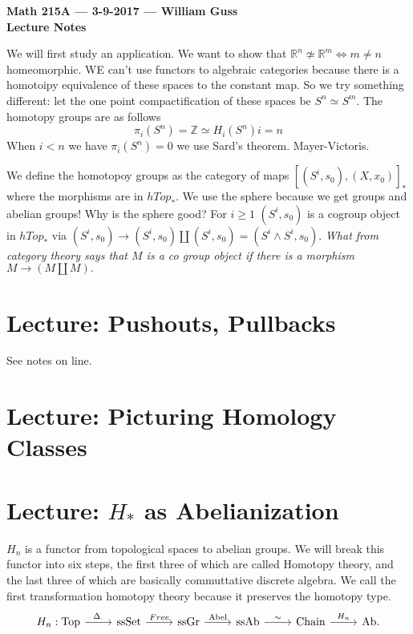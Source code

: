 \documentclass[11pt]{amsart}
\theoremstyle{definition}
\begin{document}
\begin{center}{\bf Math 215A --- 3-9-2017  --- William Guss} \\ {\bf Lecture
Notes} \end{center}
We will first study an application. We want to show that $\mathbb{R}^n \not\simeq \mathbb{R}^m \iff m \neq n$ homeomorphic. WE can't use functors to algebraic categories because there is a homotoipy equivalence of these spaces to the constant map. So we try something different: let the one point compactification of these spaces be $S^n \simeq S^m.$ The homotopy groups are as follows
\begin{equation*}
	\pi_i(S^n) = \mathbb{Z} \simeq H_i(S^n) i = n
\end{equation*}
When $i < n$ we have $\pi_i(S^n) = 0$ we use Sard's theorem. Mayer-Victoris.

We define the homotopoy groups as the category of maps  $[(S^i, s_0), (X, x_0)]_*$ where the morphisms are in $hTop_*$.
We use the sphere because we get groups and abelian groups! Why is the sphere good? For $i \geq 1$ $(S^i, s_0)$ is a cogroup object in $hTop_*$ via $(S^i, s_0) \to (S^i, s_0) \coprod (S^i, s_0) = (S^i \wedge S^i, s_0).$ \emph{What from category theory  says that $M$ is a co group object if there is a morphism $M \to (M \coprod M).$}



\section{Lecture: Pushouts, Pullbacks} 

See notes on line.

\section{Lecture: Picturing Homology Classes}

\section{Lecture: $H_*$ as Abelianization}

$H_n$ is a functor from topological spaces to abelian groups. We will break this functor into six steps, the first three of which are called Homotopy theory, and the last three of which are basically commuttative discrete algebra. We call the first transformation homotopy theory because it preserves the homotopy type.
\begin{equation*}
\begin{tikzcd}
	H_n: \text{Top} \arrow{r}{\Delta_.} & \text{ssSet} \arrow{r}{Free} & \text{ssGr} \arrow{r}{\text{Abel}} & \text{ssAb} \arrow{r}{\sim} & \text{Chain} \arrow{r}{H_n} & \text{Ab}.
\end{tikzcd}
\end{equation*}
\end{document}
